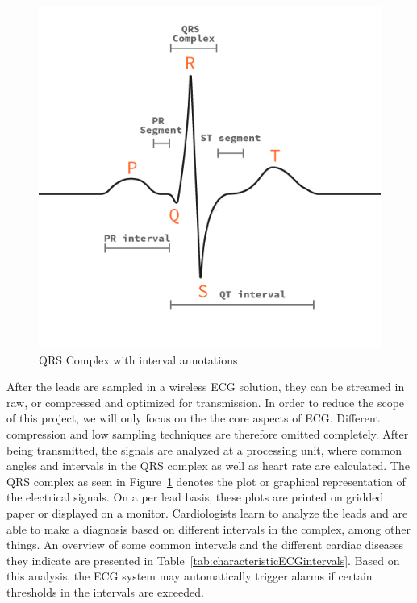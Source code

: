\begin{figure}[H]
\centering
\includegraphics[scale=0.45]{img/figures/QRS.png}
\caption{QRS Complex with interval annotations}
\label{fig:qrsAnnotations}
\end{figure}


\noindent
After the leads are sampled in a wireless ECG solution, they can be streamed in raw, or compressed and optimized for transmission\cite{Balouchestani:2013dr, Alesanco:2010kc}. In order to reduce the scope of this project, we will only focus on the the core aspects of ECG. Different compression and low sampling techniques are therefore omitted completely. After being transmitted, the signals are analyzed at a processing unit, where common angles and intervals in the QRS complex as well as heart rate are calculated. The QRS complex as seen in Figure~\ref{fig:qrsAnnotations} denotes the plot or graphical representation of the electrical signals. On a per lead basis, these plots are printed on gridded paper or displayed on a monitor. Cardiologists learn to analyze the leads and are able to make a diagnosis based on different intervals in the complex, among other things. An overview of some common intervals and the different cardiac diseases they indicate are presented in Table~\ref{tab:characteristicECGintervals}. Based on this analysis, the ECG system may automatically trigger alarms if certain thresholds in the intervals are exceeded.

